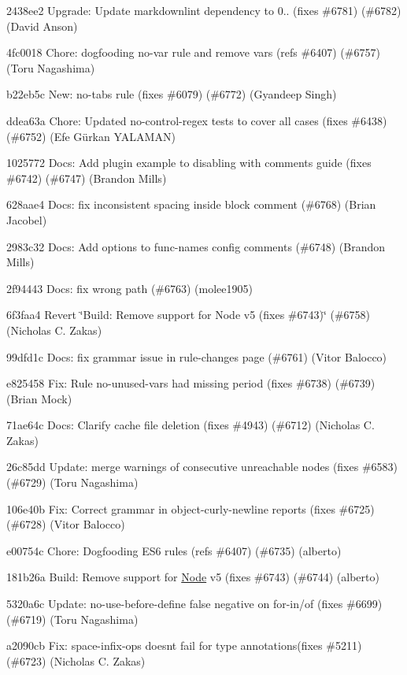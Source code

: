 \begin{DoxyItemize}
\item 2438ee2 Upgrade\+: Update markdownlint dependency to 0.. (fixes \#6781) (\#6782) (David Anson)
\item 4fc0018 Chore\+: dogfooding {\ttfamily no-\/var} rule and remove {\ttfamily var}s (refs \#6407) (\#6757) (Toru Nagashima)
\item b22eb5c New\+: {\ttfamily no-\/tabs} rule (fixes \#6079) (\#6772) (Gyandeep Singh)
\item ddea63a Chore\+: Updated no-\/control-\/regex tests to cover all cases (fixes \#6438) (\#6752) (Efe Gürkan Y\+A\+L\+A\+M\+AN)
\item 1025772 Docs\+: Add plugin example to disabling with comments guide (fixes \#6742) (\#6747) (Brandon Mills)
\item 628aae4 Docs\+: fix inconsistent spacing inside block comment (\#6768) (Brian Jacobel)
\item 2983c32 Docs\+: Add options to func-\/names config comments (\#6748) (Brandon Mills)
\item 2f94443 Docs\+: fix wrong path (\#6763) (molee1905)
\item 6f3faa4 Revert \char`\"{}\+Build\+: Remove support for Node v5 (fixes \#6743)\char`\"{} (\#6758) (Nicholas C. Zakas)
\item 99dfd1c Docs\+: fix grammar issue in rule-\/changes page (\#6761) (Vitor Balocco)
\item e825458 Fix\+: Rule no-\/unused-\/vars had missing period (fixes \#6738) (\#6739) (Brian Mock)
\item 71ae64c Docs\+: Clarify cache file deletion (fixes \#4943) (\#6712) (Nicholas C. Zakas)
\item 26c85dd Update\+: merge warnings of consecutive unreachable nodes (fixes \#6583) (\#6729) (Toru Nagashima)
\item 106e40b Fix\+: Correct grammar in object-\/curly-\/newline reports (fixes \#6725) (\#6728) (Vitor Balocco)
\item e00754c Chore\+: Dogfooding E\+S6 rules (refs \#6407) (\#6735) (alberto)
\item 181b26a Build\+: Remove support for \mbox{\hyperlink{class_node}{Node}} v5 (fixes \#6743) (\#6744) (alberto)
\item 5320a6c Update\+: {\ttfamily no-\/use-\/before-\/define} false negative on for-\/in/of (fixes \#6699) (\#6719) (Toru Nagashima)
\item a2090cb Fix\+: space-\/infix-\/ops doesn\textquotesingle{}t fail for type annotations(fixes \#5211) (\#6723) (Nicholas C. Zakas)

\end{DoxyItemize}
